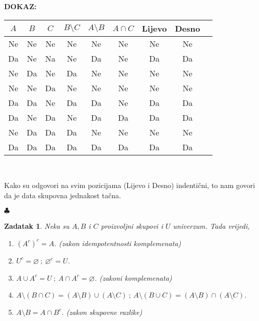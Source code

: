 \documentclass{article}
\newtheorem{zadatak}{Zadatak}
\newenvironment{dokaz}
    {\noindent\textbf{DOKAZ:}\\} {\hfill $\clubsuit$}
\begin{document}
\begin{dokaz}

    \begin{tabularx}{11cm}{|c|c|c|c|c|c|c|c|c}
    $A$ & $B$ & $C$ & $B\setminus C$ & $A\setminus B$ & $A\cap C$ & Lijevo & Desno & \\\hline
    Ne & Ne & Ne & Ne & Ne & Ne & Ne & Ne & \\\hline
    Da & Ne & Na & Ne & Da & Ne & Da & Da & \\\hline
    Ne & Da & Ne & Da & Ne & Ne & Ne & Ne & \\\hline
    Ne & Ne & Da & Ne & Ne & Ne & Ne & Ne & \\\hline
    Da & Da & Ne & Da & Da & Ne & Da & Da & \\\hline
    Da & Ne & Da & Ne & Da & Da & Da & Da & \\\hline
    Ne & Da & Da & Da & Ne & Ne & Ne & Ne & \\\hline
    Da & Da & Da & Da & Da & Da & Da & Da & \\\hline
    \end{tabularx}\\
    \smallskip
    
    \noindent
    Kako su odgovori na svim pozicijama (Lijevo i Desno) indentični, to nam govori da je data skupovna jednakost tačna.


\end{dokaz}

\begin{zadatak}
    Neka su $A, B$ i $C$ proizvoljni skupovi i $U$ univerzum. Tada vrijedi,
    \begin{enumerate}
        \item $(A^c)^c=A$. (zakon idempotentnosti komplemenata)
        \item $U^c=\varnothing\ ;\ \varnothing ^c=U$.
        \item $A\cup A^c=U\ ;\ A\cap A^c=\varnothing$. (zakoni komplemenata)
        \item $A\setminus (B\cap C)=(A\setminus B)\cup (A\setminus C)\ ;\ A\setminus (B\cup C)=(A\setminus B)\cap (A\setminus C)$.
        \item $A\setminus B=A\cap B^c$. (zakon skupovne razlike)
    \end{enumerate}
\end{zadatak}
\end{document}
